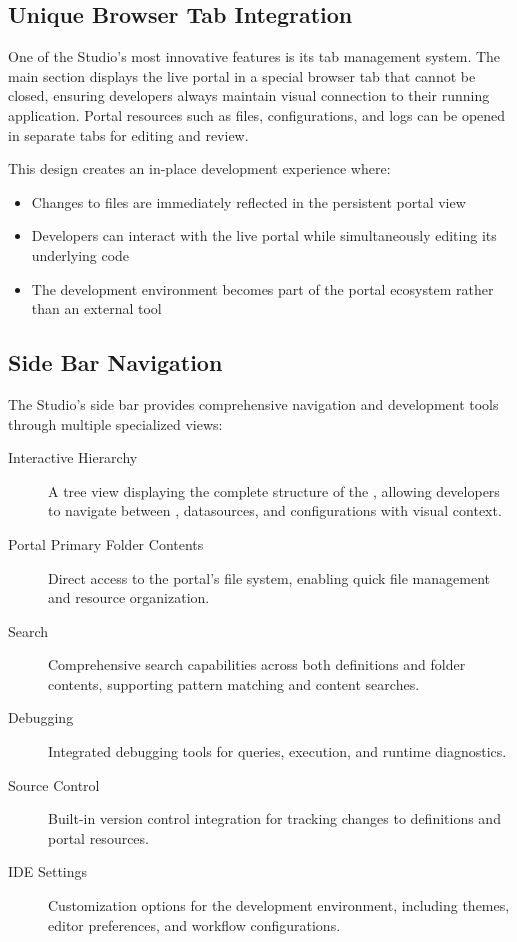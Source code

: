 \subsection{Unique Browser Tab Integration}
\label{sec:studio-browser-tab}

One of the Studio's most innovative features is its tab management system. The main section displays the live portal in a special browser tab that cannot be closed, ensuring developers always maintain visual connection to their running application. Portal resources such as files, configurations, and logs can be opened in separate tabs for editing and review.

This design creates an in-place development experience where:
\begin{itemize}
    \item Changes to \wbdl{} files are immediately reflected in the persistent portal view
    \item Developers can interact with the live portal while simultaneously editing its underlying code
    \item The development environment becomes part of the portal ecosystem rather than an external tool
\end{itemize}

\subsection{Side Bar Navigation}
\label{sec:studio-sidebar}

The Studio's side bar provides comprehensive navigation and development tools through multiple specialized views:

\begin{description}
    \item[Interactive \webbase{} Hierarchy] A tree view displaying the complete structure of the \webbase{}, allowing developers to navigate between \webbaselets{}, datasources, and configurations with visual context.
    \item[Portal Primary Folder Contents] Direct access to the portal's file system, enabling quick file management and resource organization.
    \item[Search] Comprehensive search capabilities across both \webbase{} definitions and folder contents, supporting pattern matching and content searches.
    \item[Debugging] Integrated debugging tools for \wbpl{} queries, \webbaselet{} execution, and runtime diagnostics.
    \item[Source Control] Built-in version control integration for tracking changes to \webbase{} definitions and portal resources.
    \item[IDE Settings] Customization options for the development environment, including themes, editor preferences, and workflow configurations.
\end{description}

